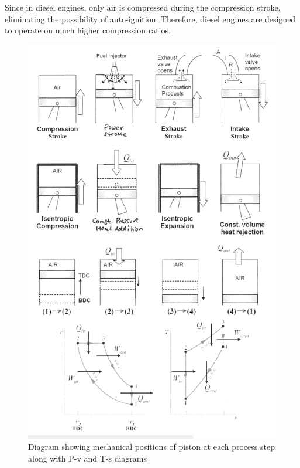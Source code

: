 \documentclass[class=report, crop=false, 12pt,a4paper]{standalone}
\begin{document}
Since in diesel engines, only air is compressed during the compression stroke, eliminating the possibility of auto-ignition. Therefore, diesel engines are designed to operate on much higher compression ratios.
\begin{figure}
  \centering
  \includegraphics[width = 0.8 \textwidth]{../img/DieselCycleDiagram}
  \caption{Diagram showing mechanical positions of piston at each process step along with P-v and T-s diagrams}
\end{figure}
\end{document}
